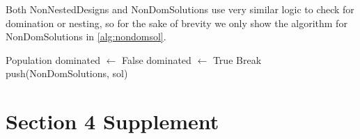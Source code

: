 \documentclass[11pt,authoryear,a4paper]{article}
\theoremstyle{definition}
\begin{document}
Both NonNestedDesigns and NonDomSolutions use very similar logic to check for domination or nesting, so for the sake of brevity we only show the algorithm for NonDomSolutions in \autoref{alg:nondomsol}.

\begin{algorithm}[h]
\caption{NonDomSolutions}  \label{alg:nondomsol}
\begin{algorithmic}
\Require Population  
    \State dominated $\gets$ False
            \State dominated $\gets$ True
            \State Break
        \EndIf
    \EndFor
        \State push(NonDomSolutions, sol)
    \EndIf 
\EndFor
\end{algorithmic}    
\end{algorithm}

\section{Section 4 Supplement}
\end{document}
